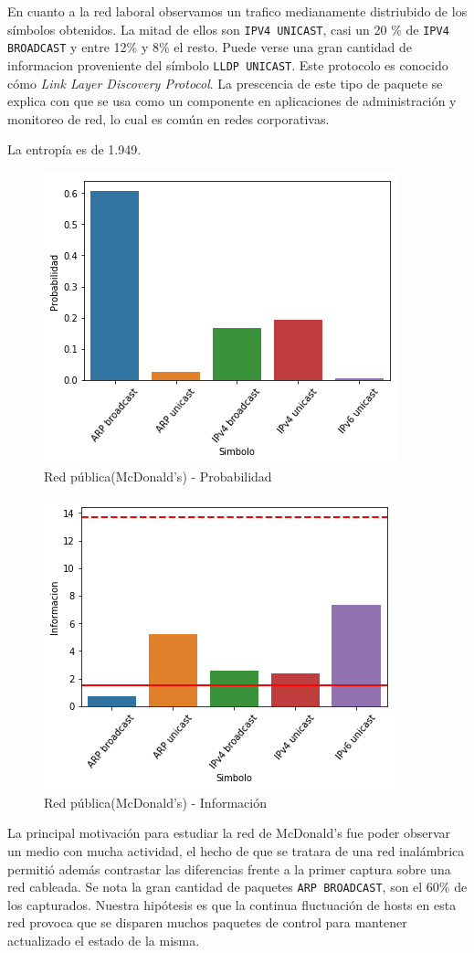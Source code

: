 En cuanto a la red laboral observamos un trafico medianamente distriubido de los símbolos obtenidos. La mitad de ellos son \texttt{IPV4 UNICAST}, casi un 20 \% de \texttt{IPV4 BROADCAST} y entre 12\% y 8\% el resto. Puede verse una gran cantidad de informacion proveniente del símbolo \texttt{LLDP UNICAST}. Este protocolo es conocido cómo \textit{Link Layer Discovery Protocol}. La prescencia de este tipo de paquete se explica con que  se usa como un componente en aplicaciones de administración y monitoreo de red, lo cual es común en redes corporativas.

La entropía es de 1.949. 

\begin{figure}[ht]
	\centering
	\includegraphics[width=.5\linewidth]{imagenes/mac_barras_prob}
	\caption{Red pública(McDonald's) - Probabilidad}
\end{figure}

\begin{figure}[ht]
	\centering
	\includegraphics[width=.5\linewidth]{imagenes/mac_barras_info}
	\caption{Red pública(McDonald's) - Información}
\end{figure}

La principal motivación para estudiar la red de McDonald's fue poder observar un medio con mucha actividad, el hecho de que se tratara de una red inalámbrica permitió además contrastar las diferencias frente a la primer captura sobre una red cableada. Se nota la gran cantidad de paquetes \texttt{ARP BROADCAST}, son el 60\% de los capturados. Nuestra hipótesis es que la continua fluctuación de hosts en esta red provoca que se disparen muchos paquetes de control para mantener actualizado el estado de la misma.

